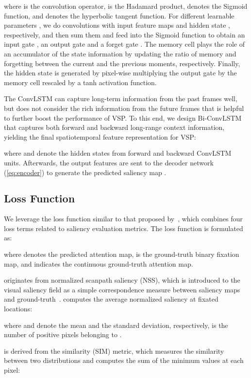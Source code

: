 \documentclass[review]{elsarticle}
\begin{document}
where  is the convolution operator,  is the Hadamard product,  denotes the Sigmoid function, and  denotes the hyperbolic tangent function.
For different learnable parameters , we do convolutions with input feature maps  and hidden state , respectively, and then sum them and feed into the Sigmoid function to obtain an input gate , an output gate  and a forget gate .
The memory cell  plays the role of an accumulator of the state information by updating the ratio of memory and forgetting between the current and the previous moments, respectively.
Finally, the hidden state  is generated by pixel-wise multiplying the output gate   by the memory cell  rescaled by a tanh activation function.


The ConvLSTM can capture long-term information from the past frames well, but does not consider the rich information from the future frames that is helpful to further boost the performance of VSP.
To this end, we design Bi-ConvLSTM that captures both forward and backward long-range context information, yielding the final spatiotemporal feature representation for VSP:

where  and  denote the hidden states from forward and backward ConvLSTM units.
Afterwards, the output features  are sent to the decoder network  (\ref{eq:encoder}) to generate the predicted saliency map .

\subsection{Loss Function}
We leverage the loss function similar to that proposed by~\cite{huang2015salicon,lai2019video}, which combines four loss terms related to saliency evaluation metrics. The loss function is formulated as:

where   denotes the predicted attention map,  is the ground-truth binary fixation map, and  indicates the continuous ground-truth attention map.


 originates from normalized scanpath saliency (NSS), which is introduced to the visual saliency field as a simple correspondence measure between saliency maps and ground-truth~\cite{peters2005components}.
 computes the average normalized saliency at fixated locations:

where  and  denote the mean and the standard deviation, respectively,  is the number of positive pixels belonging to .

 is derived from the similarity (SIM) metric, which measures the similarity between two distributions and computes the sum of the minimum values at each pixel:
\end{document}
